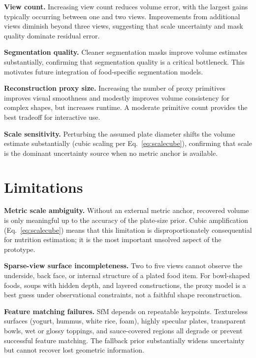 \documentclass[conference]{IEEEtran}
\begin{document}
\textbf{View count.} Increasing view count reduces volume error, with the
largest gains typically occurring between one and two views. Improvements
from additional views diminish beyond three views, suggesting that scale
uncertainty and mask quality dominate residual error.

\textbf{Segmentation quality.} Cleaner segmentation masks improve volume
estimates substantially, confirming that segmentation quality is a critical
bottleneck. This motivates future integration of food-specific segmentation
models.

\textbf{Reconstruction proxy size.} Increasing the number of proxy primitives
improves visual smoothness and modestly improves volume consistency for
complex shapes, but increases runtime. A moderate primitive count provides
the best tradeoff for interactive use.

\textbf{Scale sensitivity.} Perturbing the assumed plate diameter shifts the
volume estimate substantially (cubic scaling per Eq.~\eqref{eq:scalecube}),
confirming that scale is the dominant uncertainty source when no metric
anchor is available.

\section{Limitations}
\label{sec:limitations}

\textbf{Metric scale ambiguity.} Without an external metric anchor, recovered
volume is only meaningful up to the accuracy of the plate-size prior. Cubic
amplification (Eq.~\eqref{eq:scalecube}) means that this limitation is
disproportionately consequential for nutrition estimation; it is the most
important unsolved aspect of the prototype.

\textbf{Sparse-view surface incompleteness.} Two to five views cannot observe
the underside, back face, or internal structure of a plated food item. For
bowl-shaped foods, soups with hidden depth, and layered constructions, the
proxy model is a best guess under observational constraints, not a
faithful shape reconstruction.

\textbf{Feature matching failures.} SfM depends on repeatable keypoints.
Textureless surfaces (yogurt, hummus, white rice, foam), highly specular
plates, transparent bowls, wet or glossy toppings, and sauce-covered regions
all degrade or prevent successful feature matching. The fallback prior
substantially widens uncertainty but cannot recover lost geometric information.
\end{document}
